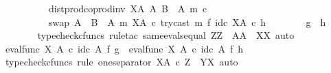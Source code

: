 \begin{isabellebody}
\ \ \ \ \ \ \ \ \ \ dist{\isacharunderscore}{\kern0pt}prod{\isacharunderscore}{\kern0pt}coprod{\isacharunderscore}{\kern0pt}inv\ {\isacharparenleft}{\kern0pt}X\isactrlbsup A\isactrlesup {\isacharparenright}{\kern0pt}\ A\ {\isacharparenleft}{\kern0pt}B\ {\isasymsetminus}\ {\isacharparenleft}{\kern0pt}A{\isacharcomma}{\kern0pt}\ m{\isacharparenright}{\kern0pt}{\isacharparenright}{\kern0pt}\ {\isasymcirc}\isactrlsub c\isanewline
\ \ \ \ \ \ \ \ \ \ swap\ {\isacharparenleft}{\kern0pt}A\ {\isasymCoprod}\ {\isacharparenleft}{\kern0pt}B\ {\isasymsetminus}\ {\isacharparenleft}{\kern0pt}A{\isacharcomma}{\kern0pt}\ m{\isacharparenright}{\kern0pt}{\isacharparenright}{\kern0pt}{\isacharparenright}{\kern0pt}\ {\isacharparenleft}{\kern0pt}X\isactrlbsup A\isactrlesup {\isacharparenright}{\kern0pt}\ {\isasymcirc}\isactrlsub c\ try{\isacharunderscore}{\kern0pt}cast\ m\ {\isasymtimes}\isactrlsub f\ id\isactrlsub c\ {\isacharparenleft}{\kern0pt}X\isactrlbsup A\isactrlesup {\isacharparenright}{\kern0pt}{\isacharparenright}{\kern0pt}\isactrlsup {\isasymsharp}\ {\isasymcirc}\isactrlsub c\ h{\isachardoublequoteclose}\isanewline
\isanewline
\ \ \ \ \ \ \isamarkupfalse%
\ {\isachardoublequoteopen}g\ {\isacharequal}{\kern0pt}\ h{\isachardoublequoteclose}\isanewline
\ \ \ \ \ \ \isamarkupfalse%
\ {\isacharparenleft}{\kern0pt}typecheck{\isacharunderscore}{\kern0pt}cfuncs{\isacharcomma}{\kern0pt}\ rule{\isacharunderscore}{\kern0pt}tac\ same{\isacharunderscore}{\kern0pt}evals{\isacharunderscore}{\kern0pt}equal{\isacharbrackleft}{\kern0pt}\ Z{\isacharequal}{\kern0pt}Z{\isacharcomma}{\kern0pt}\ \ A{\isacharequal}{\kern0pt}A{\isacharcomma}{\kern0pt}\ \ X{\isacharequal}{\kern0pt}X{\isacharbrackright}{\kern0pt}{\isacharcomma}{\kern0pt}\ auto{\isacharparenright}{\kern0pt}\isanewline
\ \ \ \ \ \ \ \ \isamarkupfalse%
\ {\isachardoublequoteopen}eval{\isacharunderscore}{\kern0pt}func\ X\ A\ {\isasymcirc}\isactrlsub c\ id\isactrlsub c\ A\ {\isasymtimes}\isactrlsub f\ g\ {\isacharequal}{\kern0pt}\ eval{\isacharunderscore}{\kern0pt}func\ X\ A\ {\isasymcirc}\isactrlsub c\ id\isactrlsub c\ A\ {\isasymtimes}\isactrlsub f\ h{\isachardoublequoteclose}\isanewline
\ \ \ \ \ \ \ \ \isamarkupfalse%
\ {\isacharparenleft}{\kern0pt}typecheck{\isacharunderscore}{\kern0pt}cfuncs{\isacharcomma}{\kern0pt}\ rule\ one{\isacharunderscore}{\kern0pt}separator{\isacharbrackleft}{\kern0pt}\ X{\isacharequal}{\kern0pt}{\isachardoublequoteopen}A\ {\isasymtimes}\isactrlsub c\ Z{\isachardoublequoteclose}{\isacharcomma}{\kern0pt}\ \ Y{\isacharequal}{\kern0pt}{\isachardoublequoteopen}X{\isachardoublequoteclose}{\isacharbrackright}{\kern0pt}{\isacharcomma}{\kern0pt}\ auto{\isacharparenright}{\kern0pt}\isanewline

\end{isabellebody}

